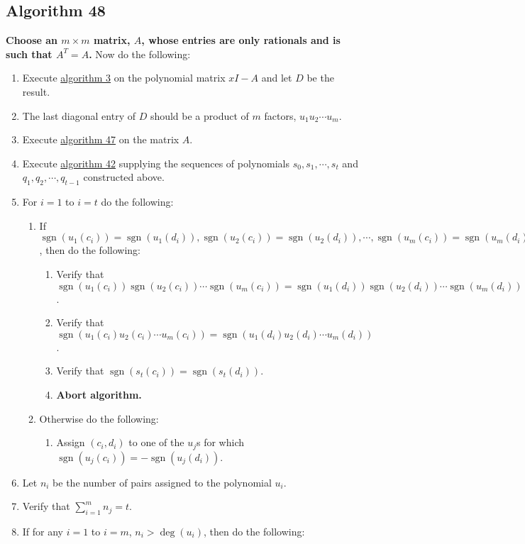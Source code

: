 \documentclass[twocolumn]{article}
\DeclareMathOperator{\sgn}{sgn}
\begin{document}
		\subsection{Algorithm 48}\label{sec:algorithm 48}
			\textbf{Choose an $m\times m$ matrix, $A$, whose entries are only rationals and is such that $A^T=A$.} Now do the following:
			\begin{enumerate}
				\item Execute \hyperref[sec:algorithm 3]{algorithm 3} on the polynomial matrix $xI-A$ and let $D$ be the result.
				\item The last diagonal entry of $D$ should be a product of $m$ factors, $u_1u_2\cdots u_m$.
				\item Execute \hyperref[sec:algorithm 47]{algorithm 47} on the matrix $A$.
				\item Execute \hyperref[sec:algorithm 42]{algorithm 42} supplying the sequences of polynomials $s_0,s_1,\cdots,s_t$ and $q_1,q_2,\cdots,q_{t-1}$ constructed above.
				\item For $i=1$ to $i=t$ do the following:
				\begin{enumerate}
					\item If $\sgn(u_1(c_i))=\sgn(u_1(d_i)), \sgn(u_2(c_i))=\sgn(u_2(d_i)), \cdots, \sgn(u_m(c_i))=\sgn(u_m(d_i))$, then do the following:
					\begin{enumerate}
						\item Verify that $\sgn(u_1(c_i))\sgn(u_2(c_i))\cdots\sgn(u_m(c_i))=\sgn(u_1(d_i))\sgn(u_2(d_i))\cdots\sgn(u_m(d_i))$.
						\item Verify that $\sgn(u_1(c_i)u_2(c_i)\cdots u_m(c_i))=\sgn(u_1(d_i)u_2(d_i)\cdots u_m(d_i))$.
						\item Verify that $\sgn(s_t(c_i))=\sgn(s_t(d_i))$.
						\item \textbf{Abort algorithm.}
					\end{enumerate}
					\item Otherwise do the following:
					\begin{enumerate}
						\item Assign $(c_i,d_i)$ to one of the $u_j$s for which $\sgn(u_j(c_i))=-\sgn(u_j(d_i))$.
					\end{enumerate}
				\end{enumerate}
				\item Let $n_i$ be the number of pairs assigned to the polynomial $u_i$.
				\item Verify that $\sum_{i=1}^m n_j=t$.
				\item If for any $i=1$ to $i=m$, $n_i>\deg(u_i)$, then do the following:

\end{enumerate}
\end{document}
